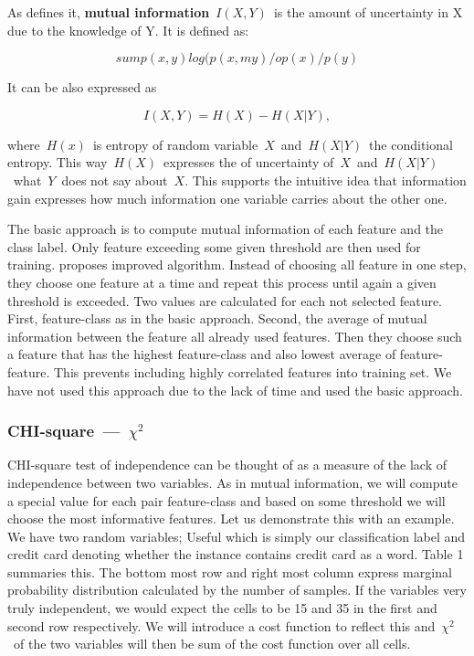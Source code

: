 As \citet{Hoq14} defines it, {\bf mutual information}~$I(X, Y)$~is the amount of uncertainty in X due to the knowledge of Y. It is defined as:

$$sum p(x,y) log(p(x,my)/op(x)/p(y)$$

It can be also expressed as

$$I(X, Y) = H(X) - H(X|Y),$$

where~$H(x)$~is entropy of random variable~$X$~and~$H(X|Y)$~the conditional entropy.
This way~$H(X)$~expresses the of uncertainty of~$X$~and~$H(X|Y)$~what~$Y$~does not say about~$X$.
This supports the intuitive idea that information gain expresses how much information one variable carries about the other one.

The basic approach is to compute mutual information of each feature and the class label.
Only feature exceeding some given threshold are then used for training.
\citet{Hoq14} proposes improved algorithm.
Instead of choosing all feature in one step, they choose one feature at a time and repeat this process until again a given threshold is exceeded.
Two values are calculated for each not selected feature.
First, feature-class as in the basic approach.
Second, the average of mutual information between the feature all already used features.
Then they choose such a feature that has the highest feature-class and also lowest average of feature-feature.
This prevents including highly correlated features into training set.
We have not used this approach due to the lack of time and used the basic approach.



\subsubsection{CHI-square~---~$\chi^2$}

CHI-square test of independence can be thought of as a measure  of the lack of independence between two variables.
As in mutual information, we will compute a special value for each pair feature-class and based on some threshold we will choose the most informative features.
Let us demonstrate this with an example.
We have two random variables;
Useful which is simply our classification label and credit card denoting whether the instance contains credit card as a word.
Table 1 summaries this. The bottom most row and right most column express marginal probability distribution calculated by the number of samples.
If the variables very truly independent, we would expect the cells to be 15 and 35 in the first and second row respectively.
We will introduce a cost function to reflect this and~$\chi^2$~of the two variables will then be sum of the cost function over all cells.

